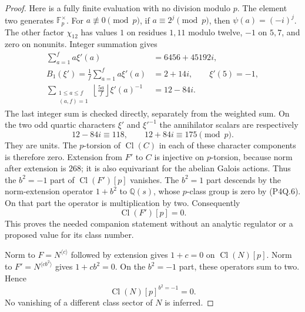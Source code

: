 \begin{proof}
Here is a fully finite evaluation with no division modulo $p$.
The element two generates $\mathbb F_p^\times$.
For $a\not\equiv0\pmod p$, if $a\equiv2^j\pmod p$, then
$\psi(a)=(-i)^j$.
The other factor $\chi_{12}$ has values $1$ on residues $1,11$
modulo twelve, $-1$ on $5,7$, and zero on nonunits.
Integer summation gives
\[
 \begin{aligned}
 \sum_{a=1}^f a\xi'(a)&=6456+45192i,\\
 B_1(\xi')=\frac1f\sum_{a=1}^f a\xi'(a)&=2+14i,
       \qquad \xi'(5)=-1,\\
 \sum_{\substack{1\leq a\leq f\\(a,f)=1}}
       \left\lfloor\frac{5a}{f}\right\rfloor\xi'(a)^{-1}
                                      &=12-84i.
 \end{aligned}
 \tag{P4Q.8}
\]
The last integer sum is checked directly, separately from the
weighted sum.  On the two odd quartic characters $\xi'$ and
$\xi'^{-1}$ the annihilator scalars are respectively
\[
       12-84i\equiv118,\qquad12+84i\equiv175\pmod p.
 \tag{P4Q.9}
\]
They are units.  The $p$-torsion of $\operatorname{Cl}(C)$
in each of these character components is therefore zero.
Extension from $F'$ to $C$ is injective on $p$-torsion, because
norm after extension is $268$; it is also equivariant for the
abelian Galois actions.  Thus the $b^2=-1$ part of
$\operatorname{Cl}(F')[p]$ vanishes.
The $b^2=1$ part descends by the norm-extension operator
$1+b^2$ to $\mathbb Q(s)$, whose $p$-class group is zero by
(P4Q.6).  On that part the operator is multiplication by two.
Consequently
\[
                         \operatorname{Cl}(F')[p]=0.
 \tag{P4Q.10}
\]
This proves the needed companion statement without an analytic
regulator or a proposed value for its class number.

Norm to $F=N^{\langle c\rangle}$ followed by extension gives
$1+c=0$ on $\operatorname{Cl}(N)[p]$.
Norm to $F'=N^{\langle cb^2\rangle}$ gives $1+cb^2=0$.
On the $b^2=-1$ part, these operators sum to two.
Hence
\[
                \operatorname{Cl}(N)[p]^{b^2=-1}=0.
 \tag{P4Q.11}
\]
No vanishing of a different class sector of $N$ is inferred.


\end{proof}

